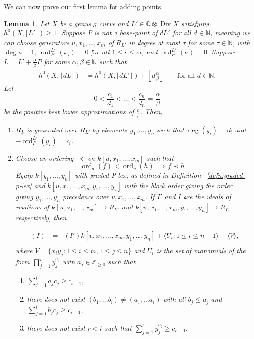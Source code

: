 \documentclass{amsart}
\theoremstyle{plain}
\newtheorem{lem}[thm]{Lemma}
\theoremstyle{definition}
\theoremstyle{remark}
\numberwithin{equation}{section}
\newcommand\BQ{{\mathbb Q}}
\DeclareMathOperator\di{Div}
\DeclareMathOperator{\ord}{ord}
\newcommand{\halfcan}{L}
\DeclareMathOperator{\initial}{in_\prec}
\begin{document}
We can now prove our first lemma for adding points.

\begin{lem}
\label{lem:sat-1}
Let $X$ be a genus $g$ curve and $\halfcan' \in \BQ \otimes \di X$
satisfying $h^0(X, \lfloor{\halfcan'}\rfloor)\ge 1$. Suppose $P$ is not a base-point of $d\halfcan'$ for all $d\in \mathbb{N}$, meaning we can choose generators $u, x_1, \ldots, x_m$ of $R_{\halfcan'}$ in degree at most $\tau$ for some $\tau\in \mathbb{N}$, with $\deg u = 1$, $\ord_P^{\halfcan'}(x_i)=0$ for all $1 \leq i \leq m$, and $\ord_P^{\halfcan'}(u) = 0$.  Suppose $\halfcan = \halfcan' + \frac{\alpha}{\beta} P$
for some $\alpha,\beta \in \mathbb{N}$ such that
\begin{align}
\label{eqn:deg1-sat-ind}
	h^0(X, \lfloor{d\halfcan}\rfloor) &= h^0(X,\lfloor d\halfcan'
	\rfloor) + \left\lfloor d\frac{\alpha} {\beta} \right \rfloor &&\text{ for all } d \in \mathbb{
	N}.
\end{align}
Let
\[
	0 < \frac{c_1}{d_1} < \ldots < \frac{c_n}{d_n} = \frac{\alpha}{\beta}
\]
be the positive best lower approximations of $\frac{\alpha}{\beta}$.
Then,

\begin{enumerate}
\item[(a)] $R_{\halfcan}$ is generated over $R_{\halfcan'}$ by elements $y_1, \ldots, y_n$ such that $\deg(y_i)=d_i$ and $-\ord_P^{L'}(y_i)=c_i$.

\item[(b)] Choose an ordering $\prec$ on $k[u, x_1, \ldots, x_m]$ such that
\[
	\ord_u(f) < \ord_u(h) \implies f\prec h.
\]
Equip $k[y_1, \ldots, y_n]$ with graded $P$-lex, as defined in Definition ~\ref{defn:graded-p-lex} and $k[u, x_1, \ldots, x_m, y_1, \ldots, y_n]$ with the block order giving the order giving $y_1, \ldots, y_n$ precedence over $u, x_1, \ldots, x_m$.  
If $I'$ and $I$ are the ideals of relations of $k[u, x_1, \ldots, x_m]\to R_{\halfcan'}$ and $k[u, x_1, \ldots, x_m, y_1, \ldots, y_n]\to R_{\halfcan}$ respectively, then 

\begin{align*}
	\initial(I) &= \initial(I') k[u, x_1, \ldots, x_m, y_1, \ldots, y_n] 
										 + \langle U_i: 1 \le i \le n-1 \rangle
										 + \langle V \rangle,\\
\end{align*}
where 
$V=\{x_i y_j: 1\le i\le m, 1\le j\le n\}$
 and $U_i$ is the set of monomials of the form $\prod_{j=1}^{i} y_j^{a_j}$ with $a_j\in \mathbb{Z}_{\ge 0}$ such that
\begin{enumerate}
	\item[(*)] $\sum_{j=1}^i a_j c_j \ge c_{i+1},$\\
	\item[(**)] there does not exist $(b_1, \ldots b_i)\ne (a_1, \ldots a_i)$ with all $b_j\le a_j$ and $\sum_{j=1}^i b_jc_j\ge c_{i+1},$ \\
	\item[(***)] there does not exist $r<i$ such that $\sum_{j=1}^r y_j^{a_j}\ge c_{r+1}$.
\end{enumerate}


\end{enumerate}
\end{lem}
\end{document}
